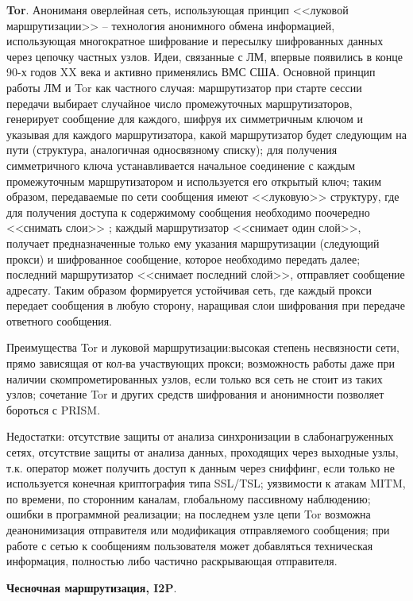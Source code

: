 \textbf{Tor}. Анониманя оверлейная сеть, использующая принцип <<луковой маршрутизации>> -- технология анонимного обмена информацией, использующая многократное шифрование и пересылку шифрованных данных через цепочку частных узлов. Идеи, связанные с ЛМ, впервые появились в конце 90-х годов XX века и активно применялись ВМС США. Основной принцип работы ЛМ и Tor как частного случая: маршрутизатор при старте сессии  передачи выбирает случайное число промежуточных маршрутизаторов, генерирует сообщение для каждого, шифруя их симметричным ключом и указывая для каждого маршрутизатора, какой маршрутизатор будет следующим на пути (структура, аналогичная односвязному списку); для получения симметричного ключа устанавливается начальное соединение с каждым промежуточным маршрутизатором и используется его открытый ключ; таким образом, передаваемые по сети сообщения имеют <<луковую>> структуру, где для получения доступа к содержимому сообщения необходимо поочередно <<снимать слои>> ; каждый маршрутизатор <<снимает один слой>>, получает предназначенные только ему указания маршрутизации (следующий прокси) и шифрованное сообщение, которое необходимо передать далее; последний маршрутизатор <<снимает последний слой>>, отправляет сообщение адресату. Таким образом формируется устойчивая сеть, где каждый прокси передает сообщения в любую сторону, наращивая слои шифрования при передаче ответного сообщения. %

Преимущества Tor и луковой маршрутизации:высокая степень несвязности сети, прямо зависящая от кол-ва участвующих прокси; возможность работы даже при наличии скомпрометированных узлов, если только вся сеть не стоит из таких узлов; сочетание Tor и других средств шифрования и анонимности позволяет бороться с PRISM. %


Недостатки: отсутствие защиты от анализа синхронизации в слабонагруженных сетях, отсутствие защиты   от анализа данных, проходящих через выходные узлы, т.к. оператор может получить доступ к данным через сниффинг, если только не используется конечная криптография типа SSL/TSL; уязвимости к атакам MITM,  по времени, по сторонним каналам, глобальному пассивному наблюдению;  %
ошибки  в программной реализации; на последнем узле цепи Tor возможна деанонимизация отправителя или модификация отправляемого сообщения;  при работе с сетью  к сообщениям пользователя может добавляться техническая информация, полностью либо частично раскрывающая отправителя. %

\textbf{Чесночная маршрутизация, I2P}.
\newpage 